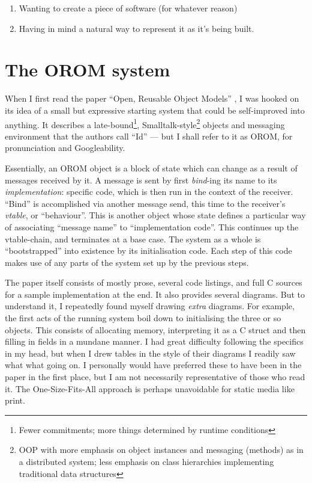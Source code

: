 \begin{enumerate}
\def\labelenumi{\alph{enumi})}
\tightlist
\item
  Wanting to create a piece of software (for whatever reason)
\item
  Having in mind a natural way to represent it as it's being built.
\end{enumerate}

\hypertarget{the-orom-system}{%
\section{The OROM system}\label{the-orom-system}}

When I first read the paper ``Open, Reusable Object Models''
\cite{OROM}, I was hooked on its idea of a small but expressive starting
system that could be self-improved into anything. It describes a
late-bound\footnote{Fewer commitments; more things determined by runtime
  conditions}, Smalltalk-style\footnote{OOP with more emphasis on object
  instances and messaging (methods) as in a distributed system; less
  emphasis on class hierarchies implementing traditional data structures}
objects and messaging environment that the authors call ``Id'' --- but I
shall refer to it as OROM, for pronunciation and Googleability.

Essentially, an OROM object is a block of state which can change as a
result of messages received by it. A message is sent by first
\emph{bind}-ing its name to its \emph{implementation}: specific code,
which is then run in the context of the receiver. ``Bind'' is
accomplished via another message send, this time to the receiver's
\emph{vtable}, or ``behaviour''. This is another object whose state
defines a particular way of associating ``message name'' to
``implementation code''. This continues up the vtable-chain, and
terminates at a base case. The system as a whole is ``bootstrapped''
into existence by its initialisation code. Each step of this code makes
use of any parts of the system set up by the previous steps.

The paper itself consists of mostly prose, several code listings, and
full C sources for a sample implementation at the end. It also provides
several diagrams. But to understand it, I repeatedly found myself
drawing \emph{extra} diagrams. For example, the first acts of the
running system boil down to initialising the three or so objects. This
consists of allocating memory, interpreting it as a C struct and then
filling in fields in a mundane manner. I had great difficulty following
the specifics in my head, but when I drew tables in the style of their
diagrams I readily saw what what going on. I personally would have
preferred these to have been in the paper in the first place, but I am
not necessarily representative of those who read it. The
One-Size-Fits-All approach is perhaps unavoidable for static media like
print.

